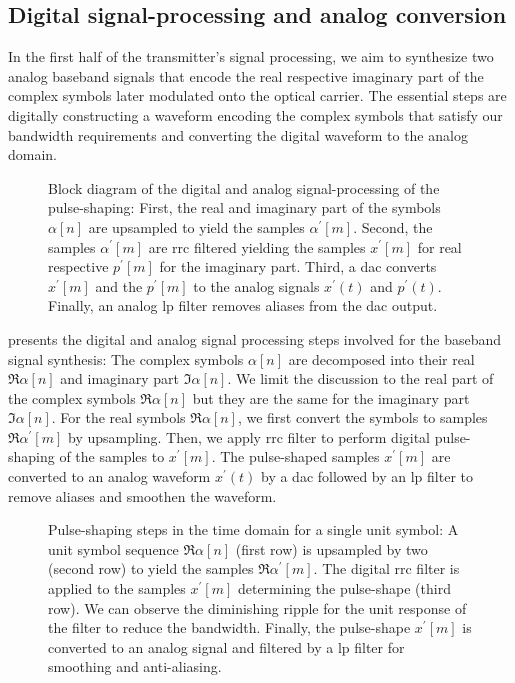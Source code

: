 \subsection{Digital signal-processing and analog conversion}

In the first half of the transmitter's signal processing, we aim to synthesize two analog baseband signals that encode the real respective imaginary part of the complex symbols later modulated onto the optical carrier.
The essential steps are digitally constructing a waveform encoding the complex symbols that satisfy our bandwidth requirements and converting the digital waveform to the analog domain.

\begin{figure}[htb]
	\centering
	
	\caption{Block diagram of the digital and analog signal-processing of the pulse-shaping: First, the real and imaginary part of the symbols $\alpha[n]$ are upsampled to yield the samples $\alpha^\prime[m]$. Second, the samples $\alpha^\prime[m]$ are \gls{rrc} filtered yielding the samples $x^\prime[m]$ for real respective $p^\prime[m]$ for the imaginary part. Third, a \gls{dac} converts $x^\prime[m]$ and the $p^\prime[m]$ to the analog signals $x^\prime(t)$ and $p^\prime(t)$. Finally, an analog \gls{lp} filter removes aliases from the \gls{dac} output.}\label{fig:pulse_shaping_block}
\end{figure}

 presents the digital and analog signal processing steps involved for the baseband signal synthesis:
The complex symbols $\alpha[n]$ are decomposed into their real $\Re\alpha[n]$ and imaginary part $\Im\alpha[n]$.
We limit the discussion to the real part of the complex symbols $\Re\alpha[n]$ but they are the same for the imaginary part $\Im\alpha[n]$.
For the real symbols $\Re\alpha[n]$, we first convert the symbols to samples $\Re\alpha^\prime[m]$ by upsampling.
Then, we apply \gls{rrc} filter to perform digital pulse-shaping of the samples to $x^\prime[m]$.
The pulse-shaped samples $x^\prime[m]$ are converted to an analog waveform $x^\prime(t)$ by a \gls{dac} followed by an \gls{lp} filter to remove aliases and smoothen the waveform.

\begin{figure}[htb]
	\centering
	
	\caption{Pulse-shaping steps in the time domain for a single unit symbol: A unit symbol sequence $\Re\alpha[n]$ (first row) is upsampled by two (second row) to yield the samples $\Re\alpha^\prime[m]$. The digital \gls{rrc} filter is applied to the samples $x^\prime[m]$ determining the pulse-shape (third row). We can observe the diminishing ripple for the unit response of the filter to reduce the bandwidth. Finally, the pulse-shape $x^\prime[m]$ is converted to an analog signal and filtered by a \gls{lp} filter for smoothing and anti-aliasing.}\label{fig:pulse_shaping_unit_time}
\end{figure}

